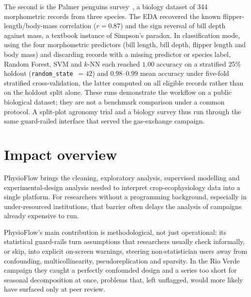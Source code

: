 \documentclass[11pt, letterpaper]{article}
\begin{document}
The second is the Palmer penguins survey~\cite{Gorman2014}, a biology dataset of 344 morphometric records from three species. The EDA recovered the known flipper-length/body-mass correlation ($r=0.87$) and the sign reversal of bill depth against mass, a textbook instance of Simpson's paradox. In classification mode, using the four morphometric predictors (bill length, bill depth, flipper length and body mass) and discarding records with a missing predictor or species label, Random Forest, SVM and $k$-NN each reached $1.00$ accuracy on a stratified 25\% holdout (\texttt{random\_state}~$=42$) and $0.98$--$0.99$ mean accuracy under five-fold stratified cross-validation, the latter computed on all eligible records rather than on the holdout split alone. These runs demonstrate the workflow on a public biological dataset; they are not a benchmark comparison under a common protocol. A split-plot agronomy trial and a biology survey thus run through the same guard-railed interface that served the gas-exchange campaign.

\section{Impact overview}\label{sec:impact}

PhysioFlow brings the cleaning, exploratory analysis, supervised modelling and experimental-design analysis needed to interpret crop-ecophysiology data into a single platform. For researchers without a programming background, especially in under-resourced institutions, that barrier often delays the analysis of campaigns already expensive to run.

PhysioFlow's main contribution is methodological, not just operational: its statistical guard-rails turn assumptions that researchers usually check informally, or skip, into explicit on-screen warnings, steering non-statistician users away from confounding, multicollinearity, pseudoreplication and sparsity. In the Rio Verde campaign they caught a perfectly confounded design and a series too short for seasonal decomposition at once, problems that, left unflagged, would more likely have surfaced only at peer review.
\end{document}
